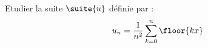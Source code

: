 \begin{exercice}
Etudier  la suite $\suite{u}$ définie par : 
$$u_n = \frac{1}{n^2}\sum_{k=0}^n \floor{kx}$$
\end{exercice}